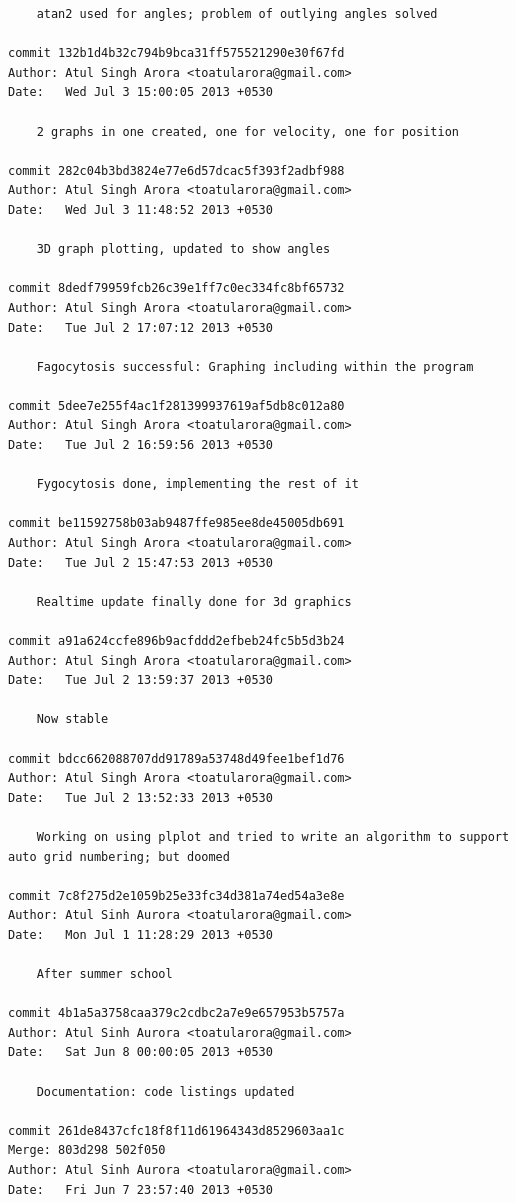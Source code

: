 \begin{lstlisting}
    atan2 used for angles; problem of outlying angles solved

commit 132b1d4b32c794b9bca31ff575521290e30f67fd
Author: Atul Singh Arora <toatularora@gmail.com>
Date:   Wed Jul 3 15:00:05 2013 +0530

    2 graphs in one created, one for velocity, one for position

commit 282c04b3bd3824e77e6d57dcac5f393f2adbf988
Author: Atul Singh Arora <toatularora@gmail.com>
Date:   Wed Jul 3 11:48:52 2013 +0530

    3D graph plotting, updated to show angles

commit 8dedf79959fcb26c39e1ff7c0ec334fc8bf65732
Author: Atul Singh Arora <toatularora@gmail.com>
Date:   Tue Jul 2 17:07:12 2013 +0530

    Fagocytosis successful: Graphing including within the program

commit 5dee7e255f4ac1f281399937619af5db8c012a80
Author: Atul Singh Arora <toatularora@gmail.com>
Date:   Tue Jul 2 16:59:56 2013 +0530

    Fygocytosis done, implementing the rest of it

commit be11592758b03ab9487ffe985ee8de45005db691
Author: Atul Singh Arora <toatularora@gmail.com>
Date:   Tue Jul 2 15:47:53 2013 +0530

    Realtime update finally done for 3d graphics

commit a91a624ccfe896b9acfddd2efbeb24fc5b5d3b24
Author: Atul Singh Arora <toatularora@gmail.com>
Date:   Tue Jul 2 13:59:37 2013 +0530

    Now stable

commit bdcc662088707dd91789a53748d49fee1bef1d76
Author: Atul Singh Arora <toatularora@gmail.com>
Date:   Tue Jul 2 13:52:33 2013 +0530

    Working on using plplot and tried to write an algorithm to support auto grid numbering; but doomed

commit 7c8f275d2e1059b25e33fc34d381a74ed54a3e8e
Author: Atul Sinh Aurora <toatularora@gmail.com>
Date:   Mon Jul 1 11:28:29 2013 +0530

    After summer school

commit 4b1a5a3758caa379c2cdbc2a7e9e657953b5757a
Author: Atul Sinh Aurora <toatularora@gmail.com>
Date:   Sat Jun 8 00:00:05 2013 +0530

    Documentation: code listings updated

commit 261de8437cfc18f8f11d61964343d8529603aa1c
Merge: 803d298 502f050
Author: Atul Sinh Aurora <toatularora@gmail.com>
Date:   Fri Jun 7 23:57:40 2013 +0530


\end{lstlisting}

